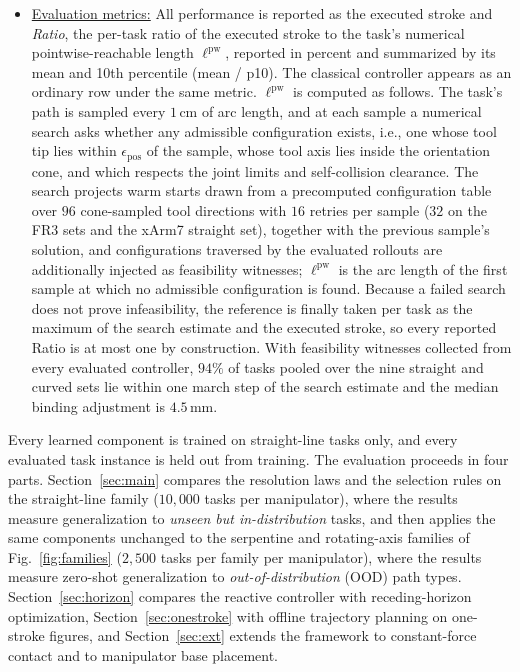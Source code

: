 \documentclass[journal, twoside]{IEEEtran}
\begin{document}
\begin{itemize}[leftmargin=1em]
    \item \uline{Evaluation metrics:}
    All performance is reported as the executed stroke and \emph{Ratio},
    the per-task ratio of the executed stroke to the task's numerical
    pointwise-reachable length $\ell^{\mathrm{pw}}$, reported in percent
    and summarized by its mean and 10th percentile (mean / p10). The classical controller
    appears as an ordinary row under the same metric. $\ell^{\mathrm{pw}}$
    is computed as follows. The task's path is sampled every $1$\,cm of
    arc length, and at each sample a numerical search asks whether any
    admissible configuration exists, i.e., one whose tool tip lies within
    $\epsilon_{\mathrm{pos}}$ of the sample, whose tool axis lies inside
    the orientation cone, and which respects the joint limits and
    self-collision clearance. The search projects warm starts drawn from a
    precomputed configuration table over $96$ cone-sampled tool directions
    with $16$ retries per sample ($32$ on the FR3 sets and the xArm7
    straight set), together with the previous sample's
    solution, and configurations traversed by the evaluated rollouts are
    additionally injected as feasibility witnesses;
    $\ell^{\mathrm{pw}}$ is the arc length of the first sample at which no
    admissible configuration is found. Because a failed search does not
    prove infeasibility, the reference is finally taken per task as the
    maximum of the search estimate and the executed stroke, so every
    reported Ratio is at most one by construction. With feasibility
    witnesses collected from every evaluated controller, $94\%$ of tasks
    pooled over the nine straight and curved sets lie within one march
    step of the search estimate and the median binding adjustment is
    $4.5$\,mm.
\end{itemize}

Every learned component is trained on straight-line tasks only, and
every evaluated task instance is held out from training. The evaluation
proceeds in four parts. Section~\ref{sec:main} compares the resolution
laws and the selection rules on the straight-line family ($10{,}000$
tasks per manipulator), where the results measure generalization to
\emph{unseen but in-distribution} tasks, and then applies the same
components unchanged to the serpentine and rotating-axis families of
Fig.~\ref{fig:families} ($2{,}500$ tasks per family per manipulator),
where the results measure zero-shot generalization to
\emph{out-of-distribution} (OOD) path types. Section~\ref{sec:horizon}
compares the reactive controller with receding-horizon optimization,
Section~\ref{sec:onestroke} with offline trajectory planning on
one-stroke figures, and Section~\ref{sec:ext} extends the framework to
constant-force contact and to manipulator base placement.
\end{document}
